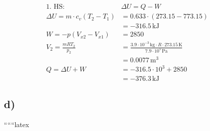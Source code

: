 \begin{align*}
\text{1. HS:} \quad & \Delta U = Q - W \\
\Delta U = m \cdot c_v (T_2 - T_1) &= 0.633 \cdot (273.15 - 773.15) \\
&= -316.5 \, \text{kJ} \\
W = -p (V_{x2} - V_{x1}) &= 2850 \\
V_2 = \frac{m R T_2}{p_2} &= \frac{3.9 \cdot 10^{-3} \, \text{kg} \cdot R \cdot 273.15 \, \text{K}}{7.9 \cdot 10^5 \, \text{Pa}} \\
&= 0.0077 \, \text{m}^3 \\
Q = \Delta U + W &= -316.5 \cdot 10^3 + 2850 \\
&= -376.3 \, \text{kJ}
\end{align*}

\subsection*{d)}

``````latex


